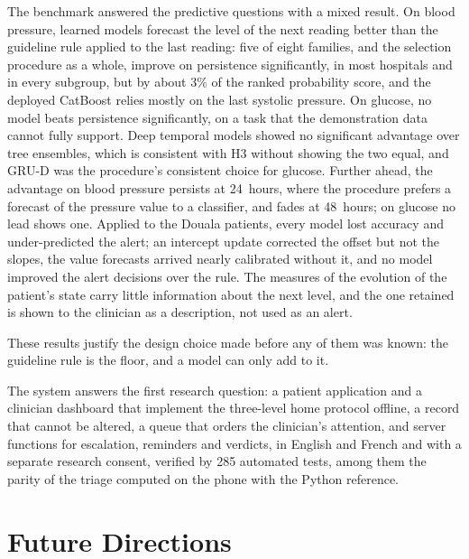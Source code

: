 The benchmark answered the predictive questions with a mixed result. On blood pressure, learned models forecast the level of the next reading better than the guideline rule applied to the last reading: five of eight families, and the selection procedure as a whole, improve on persistence significantly, in most hospitals and in every subgroup, but by about 3\% of the ranked probability score, and the deployed CatBoost relies mostly on the last systolic pressure. On glucose, no model beats persistence significantly, on a task that the demonstration data cannot fully support. Deep temporal models showed no significant advantage over tree ensembles, which is consistent with H3 without showing the two equal, and GRU-D was the procedure's consistent choice for glucose. Further ahead, the advantage on blood pressure persists at 24~hours, where the procedure prefers a forecast of the pressure value to a classifier, and fades at 48~hours; on glucose no lead shows one. Applied to the Douala patients, every model lost accuracy and under-predicted the alert; an intercept update corrected the offset but not the slopes, the value forecasts arrived nearly calibrated without it, and no model improved the alert decisions over the rule. The measures of the evolution of the patient's state carry little information about the next level, and the one retained is shown to the clinician as a description, not used as an alert.

These results justify the design choice made before any of them was known: the guideline rule is the floor, and a model can only add to it.

The system answers the first research question: a patient application and a clinician dashboard that implement the three-level home protocol offline, a record that cannot be altered, a queue that orders the clinician's attention, and server functions for escalation, reminders and verdicts, in English and French and with a separate research consent, verified by 285 automated tests, among them the parity of the triage computed on the phone with the Python reference.

\section*{Future Directions}

